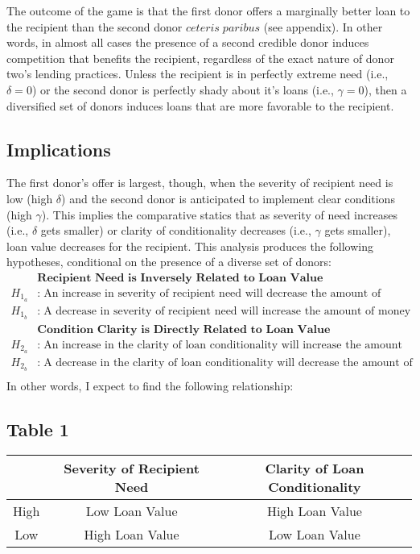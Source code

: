 \documentclass{article}
\begin{document}
The outcome of the game is that the first donor offers a marginally better loan to the recipient than the second donor $ceteris\;paribus$ (see appendix). In other words, in almost all cases the presence of a second credible donor induces competition that benefits the recipient, regardless of the exact nature of donor two's lending practices. Unless the recipient is in perfectly extreme need (i.e., $\delta=0$) or the second donor is perfectly shady about it's loans (i.e., $\gamma=0$), then a diversified set of donors induces loans that are more favorable to the recipient.

\subsection*{Implications}
The first donor's offer is largest, though, when the severity of recipient need is low (high $\delta$) and the second donor is anticipated to implement clear conditions (high $\gamma$). This implies the comparative statics that as severity of need increases (i.e., $\delta$ gets smaller) or clarity of conditionality decreases (i.e., $\gamma$ gets smaller), loan value decreases for the recipient. This analysis produces the following hypotheses, conditional on the presence of a diverse set of donors:
\begin{align*}
    &\textbf{Recipient Need is Inversely Related to Loan Value}\\
    H_{1_a}&:\;\text{An increase in severity of recipient need will decrease the amount of money offered via loans}\\
    H_{1_b}&:\;\text{A decrease in severity of recipient need will increase the amount of money offered via loans}\\
    &\textbf{Condition Clarity is Directly Related to Loan Value}\\
    H_{2_a}&:\;\text{An increase in the clarity of loan conditionality will increase the amount of money offered via loans}\\
    H_{2_b}&:\;\text{A decrease in the clarity of loan conditionality will decrease the amount of money offered via loans}\\
\end{align*}
In other words, I expect to find the following relationship:

\subsection*{Table 1}
\begin{tabular}{c|c c }
    & Severity of Recipient Need & Clarity of Loan Conditionality\\
    \hline
    High & Low Loan Value & High Loan Value\\
    Low & High Loan Value & Low Loan Value\\
\end{tabular}
\end{document}
